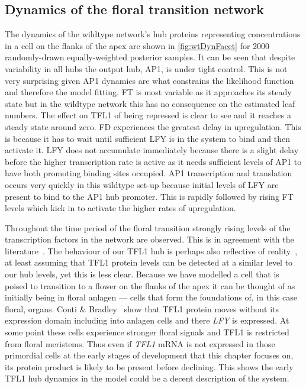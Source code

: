 \subsection{Dynamics of the floral transition network}

The dynamics of the wildtype network's hub proteins representing concentrations in a cell on the flanks of the apex are shown in \autoref{fig:wtDynFacet} for 2000 randomly-drawn equally-weighted posterior samples.
It can be seen that despite variability in all hubs the output hub, AP1, is under tight control.
This is not very surprising given AP1 dynamics are what constrains the likelihood function and therefore the model fitting.
FT is most variable as it approaches its steady state but in the wildtype network this has no consequence on the estimated leaf numbers.
The effect on TFL1 of being repressed is clear to see and it reaches a steady state around zero.
FD experiences the greatest delay in upregulation.
This is because it has to wait until sufficient LFY is in the system to bind and then activate it.
LFY does not accumulate immediately because there is a slight delay before the higher transcription rate is active as it needs sufficient levels of AP1 to have both promoting binding sites occupied.
AP1 transcription and translation occurs very quickly in this wildtype set-up because initial levels of LFY are present to bind to the AP1 hub promoter.
This is rapidly followed by rising FT levels which kick in to activate the higher rates of upregulation.

Throughout the time period of the floral transition strongly rising levels of the transcription factors in the network are observed.
This is in agreement with the literature~\cite{ratcliffe1998, ratcliffe1999, wigge2005}.
The behaviour of our TFL1 hub is perhaps also reflective of reality~\cite{conti2007}, at least assuming that TFL1 protein levels can be detected at a similar level to our hub levels, yet this is less clear.
Because we have modelled a cell that is poised to transition to a flower on the flanks of the apex it can be thought of as initially being in floral anlagen --- cells that form the foundations of, in this case floral, organs.
Conti \& Bradley~\cite{conti2007} show that TFL1 protein moves without its expression domain including into anlagen cells and there \emph{LFY} is expressed.
At some point these cells experience stronger floral signals and TFL1 is restricted from floral meristems.
Thus even if \emph{TFL1} mRNA is not expressed in those primordial cells at the early stages of development that this chapter focuses on, its protein product is likely to be present before declining.
This shows the early TFL1 hub dynamics in the model could be a decent description of the system.

